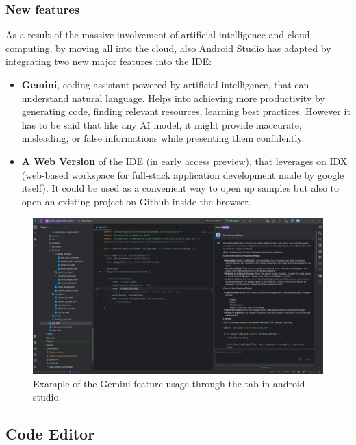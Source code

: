 \subsubsection{New features}

As a result of the massive involvement of artificial intelligence and cloud computing, by moving all into the cloud, also Android Studio has adapted by integrating two new major features into the IDE\cite{AndroidStudioNewFeatures}:

\begin{itemize}[nosep] %
    \item \textbf{Gemini}, coding assistant powered by artificial intelligence, that can understand natural language. Helps into achieving more productivity by generating code, finding relevant resources, learning best practices. However it has to be said that like any AI model, it might provide inaccurate, misleading, or false informations while presenting them confidently.
    \item \textbf{A Web Version} of the IDE (in early access preview), that leverages on IDX (web-based workspace for full-stack application development made by google itself). It could be used as a convenient way to open up samples but also to open an existing project on Github inside the browser.
\end{itemize}

\begin{figure}
    \includegraphics[width=1.0\linewidth]{./images/gemini.png}
    \caption{Example of the Gemini feature usage through the tab in android studio.}
\end{figure}

\subsection{Code Editor}

